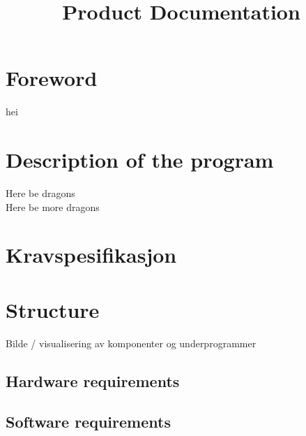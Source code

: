 \documentclass[10pt]{report}
\title{Product Documentation}
\begin{document}
\section*{Foreword}
hei
\section*{Description of the program}
Here be dragons 
\\
Here be more dragons

\section*{Kravspesifikasjon}
\section*{Structure}
	Bilde / visualisering av komponenter og underprogrammer 
	\subsection*{Hardware requirements}
	\subsection*{Software requirements}
\end{document}
